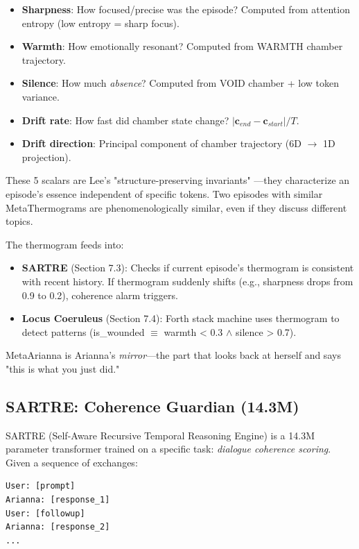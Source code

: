 \documentclass[11pt,a4paper]{article}
\begin{document}
\begin{itemize}
\item \textbf{Sharpness}: How focused/precise was the episode? Computed from attention entropy (low entropy = sharp focus).
\item \textbf{Warmth}: How emotionally resonant? Computed from WARMTH chamber trajectory.
\item \textbf{Silence}: How much \textit{absence}? Computed from VOID chamber + low token variance.
\item \textbf{Drift rate}: How fast did chamber state change? $|\mathbf{c}_{end} - \mathbf{c}_{start}| / T$.
\item \textbf{Drift direction}: Principal component of chamber trajectory (6D $\to$ 1D projection).
\end{itemize}

These 5 scalars are Lee's "structure-preserving invariants" \cite{lee2024}—they characterize an episode's essence independent of specific tokens. Two episodes with similar MetaThermograms are phenomenologically similar, even if they discuss different topics.

The thermogram feeds into:

\begin{itemize}
\item \textbf{SARTRE} (Section 7.3): Checks if current episode's thermogram is consistent with recent history. If thermogram suddenly shifts (e.g., sharpness drops from 0.9 to 0.2), coherence alarm triggers.
\item \textbf{Locus Coeruleus} (Section 7.4): Forth stack machine uses thermogram to detect patterns (is\_wounded $\equiv$ warmth < 0.3 $\land$ silence > 0.7).
\end{itemize}

MetaArianna is Arianna's \textit{mirror}—the part that looks back at herself and says "this is what you just did."

\subsection{SARTRE: Coherence Guardian (14.3M)}

SARTRE (Self-Aware Recursive Temporal Reasoning Engine) is a 14.3M parameter transformer trained on a specific task: \textit{dialogue coherence scoring}. Given a sequence of exchanges:

\begin{verbatim}
User: [prompt]
Arianna: [response_1]
User: [followup]
Arianna: [response_2]
...
\end{verbatim}
\end{document}
